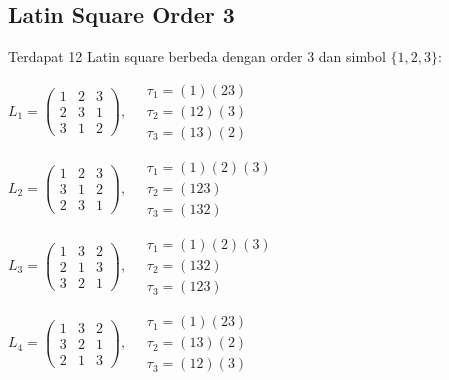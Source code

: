 
\subsection*{Latin Square Order 3}

Terdapat 12 Latin square berbeda dengan order 3 dan simbol $\{1, 2, 3\}$:

$L_{1} = \begin{pmatrix} 1 & 2 & 3 \\ 2 & 3 & 1 \\ 3 & 1 & 2 \end{pmatrix}, \quad \begin{matrix} \tau_{1} = (1)(2 3) \\ \tau_{2} = (1 2)(3) \\ \tau_{3} = (1 3)(2) \end{matrix}$

$L_{2} = \begin{pmatrix} 1 & 2 & 3 \\ 3 & 1 & 2 \\ 2 & 3 & 1 \end{pmatrix}, \quad \begin{matrix} \tau_{1} = (1)(2)(3) \\ \tau_{2} = (1 2 3) \\ \tau_{3} = (1 3 2) \end{matrix}$

$L_{3} = \begin{pmatrix} 1 & 3 & 2 \\ 2 & 1 & 3 \\ 3 & 2 & 1 \end{pmatrix}, \quad \begin{matrix} \tau_{1} = (1)(2)(3) \\ \tau_{2} = (1 3 2) \\ \tau_{3} = (1 2 3) \end{matrix}$

$L_{4} = \begin{pmatrix} 1 & 3 & 2 \\ 3 & 2 & 1 \\ 2 & 1 & 3 \end{pmatrix}, \quad \begin{matrix} \tau_{1} = (1)(2 3) \\ \tau_{2} = (1 3)(2) \\ \tau_{3} = (1 2)(3) \end{matrix}$

